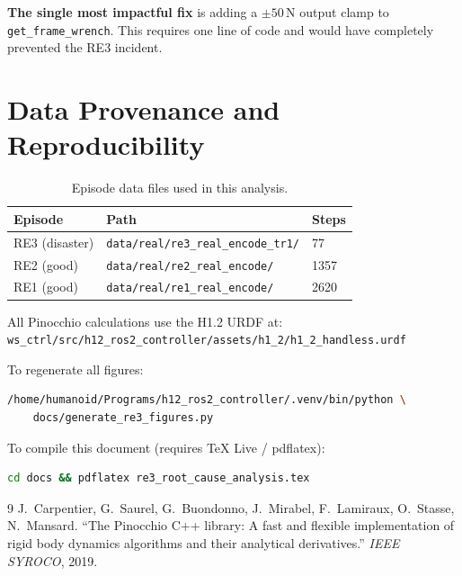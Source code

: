 \documentclass[11pt,a4paper]{article}
\begin{document}
\bigskip
\noindent\textbf{The single most impactful fix} is adding a
$\pm 50$\,N output clamp to \texttt{get\_frame\_wrench}.  This requires
one line of code and would have completely prevented the RE3 incident.

\appendix
\section{Data Provenance and Reproducibility}

\begin{table}[H]
\centering
\caption{Episode data files used in this analysis.}
\begin{tabular}{lll}
\toprule
Episode & Path & Steps \\
\midrule
RE3 (disaster) & \texttt{data/real/re3\_real\_encode\_tr1/} & 77 \\
RE2 (good)     & \texttt{data/real/re2\_real\_encode/}     & 1357 \\
RE1 (good)     & \texttt{data/real/re1\_real\_encode/}     & 2620 \\
\bottomrule
\end{tabular}
\end{table}

All Pinocchio calculations use the H1.2 URDF at:\\
\texttt{ws\_ctrl/src/h12\_ros2\_controller/assets/h1\_2/h1\_2\_handless.urdf}

To regenerate all figures:
\begin{lstlisting}[language=bash, caption={Reproduce figures.}]
/home/humanoid/Programs/h12_ros2_controller/.venv/bin/python \
    docs/generate_re3_figures.py
\end{lstlisting}

To compile this document (requires TeX Live / pdflatex):
\begin{lstlisting}[language=bash, caption={Compile LaTeX.}]
cd docs && pdflatex re3_root_cause_analysis.tex
\end{lstlisting}

\begin{thebibliography}{9}
  J.\ Carpentier, G.\ Saurel, G.\ Buondonno, J.\ Mirabel, F.\ Lamiraux,
  O.\ Stasse, N.\ Mansard.
  ``The Pinocchio C++ library: A fast and flexible implementation of rigid
  body dynamics algorithms and their analytical derivatives.''
  \textit{IEEE SYROCO}, 2019.
\end{thebibliography}
\end{document}
